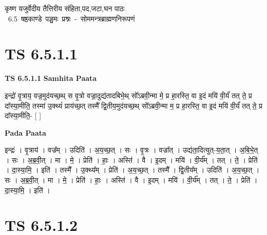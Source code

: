 \documentclass[17pt]{extarticle}
\begin{document}
\begin{titlepage}
    \begin{center}
 
\begin{sanskrit}
    { \Huge
    कृष्ण यजुर्वेदीय तैत्तिरीय संहिता,पद,जटा,घन पाठः 
    }
    \\
    \vspace{2.5cm}
    \mbox{ \Huge
    6.5      षष्ठकाण्डे पञ्चमः प्रश्नः - सोममन्त्रब्राह्मणनिरूपणं   }
\end{sanskrit}
\end{center}

\end{titlepage}
\tableofcontents
\pagebreak

\section*{ TS 6.5.1.1 }

\textbf{TS 6.5.1.1 } \newline
\textbf{Samhita Paata} \newline

इन्द्रो॑ वृ॒त्राय॒ वज्र॒मुद॑यच्छ॒थ् स वृ॒त्रो वज्रा॒दुद्य॑तादबिभे॒थ् सो᳚ऽब्रवी॒न्मा मे॒ प्र हा॒रस्ति॒ वा इ॒दं मयि॑ वी॒र्यं॑ तत् ते॒ प्र दा᳚स्या॒मीति॒ तस्मा॑ उ॒क्थ्यं॑ प्राय॑च्छ॒त् तस्मै᳚ द्वि॒तीय॒मुद॑यच्छ॒थ् सो᳚ऽब्रवी॒न्मा म॒ प्र हा॒रस्ति॒ वा इ॒दं मयि॑ वी॒र्यं॑ तत् ते॒ प्र दा᳚स्या॒मीति॒- [  ] \newline

\textbf{Pada Paata} \newline

इन्द्रः॑ । वृ॒त्राय॑ । वज्र᳚म् । उदिति॑ । अ॒य॒च्छ॒त् । सः । वृ॒त्रः । वज्रा᳚त् । उद्य॑ता॒दित्युत्-य॒ता॒त् । अ॒बि॒भे॒त् । सः । अ॒ब्र॒वी॒त् । मा । मे॒ । प्रेति॑ । हाः॒ । अस्ति॑ । वै । इ॒दम् । मयि॑ । वी॒र्य᳚म् । तत् । ते॒ । प्रेति॑ । दा॒स्या॒मि॒ । इति॑ । तस्मै᳚ । उ॒क्थ्य᳚म् । प्रेति॑ । अ॒य॒च्छ॒त् । तस्मै᳚ । द्वि॒तीय᳚म् । उदिति॑ । अ॒य॒च्छ॒त् । सः । अ॒ब्र॒वी॒त् । मा । मे॒ । प्रेति॑ । हाः॒ । अस्ति॑ । वै । इ॒दम् । मयि॑ । वी॒र्य᳚म् । तत् । ते॒ । प्रेति॑ । दा॒स्या॒मि॒ । इति॑ ।  \newline




\section*{ TS 6.5.1.2 }
\end{document}
